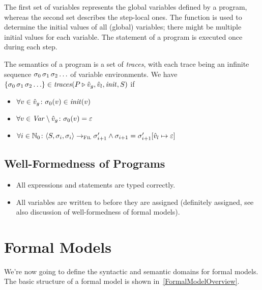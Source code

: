 \documentclass[a4paper,10pt,english]{article}
\begin{document}
The first set of variables represents the global variables defined by a program, whereas the second set describes the step-local
ones. The function is used to determine the initial values of all (global) variables; there might be multiple initial
values for each variable. The statement of a program is executed once during each step.

\begin{samepage}
	The semantics of a \Fil program is a set of \textit{traces}, with each trace being an infinite sequence $\sigma_0 \,
	\sigma_1 \, \sigma_2 \ldots$ of variable environments. We have $\{ \sigma_0 \, \sigma_1 \, \sigma_2 \ldots \}
	\in \mathit{traces}(P \triangleright \hat{v}_g, \hat{v}_l, \mathit{init}, S)$ if
	\begin{itemize}
		\item $\forall v \in \hat{v}_g \colon \sigma_0(v) \in \mathit{init}(v)$
		\item $\forall v \in \mathit{Var} \setminus \hat{v}_g \colon \sigma_0(v) = \varepsilon$
		\item $\forall i \in \mathbb{N}_0 \colon \langle S, \sigma_i, \sigma_i \rangle \rightarrow_{\textsc{Fil}}
		\sigma_{i+1}' \wedge \sigma_{i+1} = \sigma_{i + 1}'[\hat{v}_l \mapsto \varepsilon]$
	\end{itemize}
\end{samepage}

\subsection{Well-Formedness of \Fil Programs}
\begin{itemize}
	\item All expressions and statements are typed correctly.
	\item All variables are written to before they are assigned (definitely assigned, see also discussion of well-formedness of
	formal models).
\end{itemize}

\section{Formal Models}
We're now going to define the syntactic and semantic
domains for formal models. The basic structure of a formal model is shown in~\cref{FormalModelOverview}.
\end{document}
